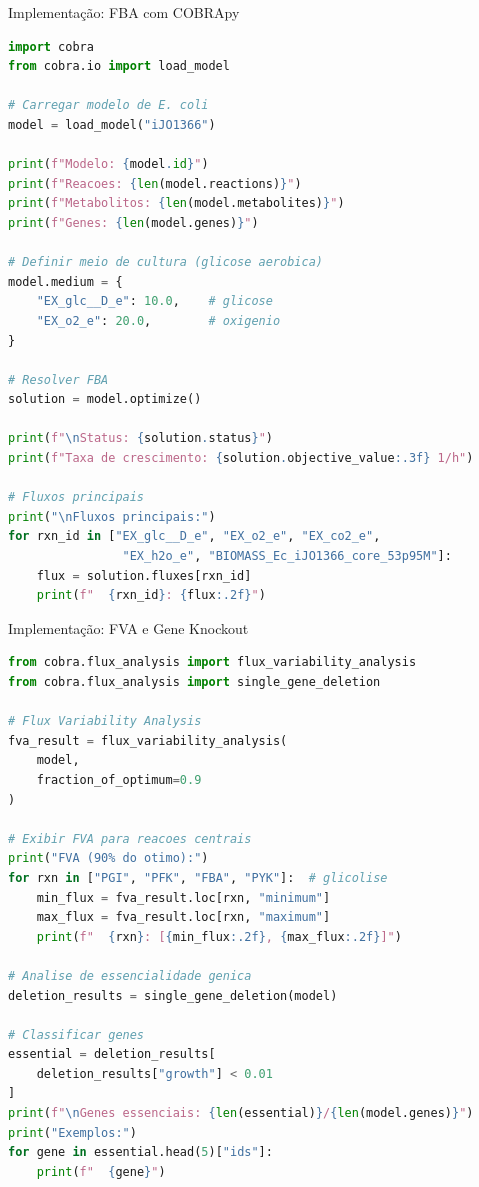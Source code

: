 \begin{frame}[fragile]{Implementação: FBA com COBRApy}
\begin{lstlisting}[language=Python, caption=FBA básico com COBRApy]
import cobra
from cobra.io import load_model

# Carregar modelo de E. coli
model = load_model("iJO1366")

print(f"Modelo: {model.id}")
print(f"Reacoes: {len(model.reactions)}")
print(f"Metabolitos: {len(model.metabolites)}")
print(f"Genes: {len(model.genes)}")

# Definir meio de cultura (glicose aerobica)
model.medium = {
    "EX_glc__D_e": 10.0,    # glicose
    "EX_o2_e": 20.0,        # oxigenio
}

# Resolver FBA
solution = model.optimize()

print(f"\nStatus: {solution.status}")
print(f"Taxa de crescimento: {solution.objective_value:.3f} 1/h")

# Fluxos principais
print("\nFluxos principais:")
for rxn_id in ["EX_glc__D_e", "EX_o2_e", "EX_co2_e",
                "EX_h2o_e", "BIOMASS_Ec_iJO1366_core_53p95M"]:
    flux = solution.fluxes[rxn_id]
    print(f"  {rxn_id}: {flux:.2f}")
\end{lstlisting}
\end{frame}

\begin{frame}[fragile]{Implementação: FVA e Gene Knockout}
\begin{lstlisting}[language=Python, caption=FVA e análise de essencialidade, basicstyle=\ttfamily\footnotesize]
from cobra.flux_analysis import flux_variability_analysis
from cobra.flux_analysis import single_gene_deletion

# Flux Variability Analysis
fva_result = flux_variability_analysis(
    model,
    fraction_of_optimum=0.9
)

# Exibir FVA para reacoes centrais
print("FVA (90% do otimo):")
for rxn in ["PGI", "PFK", "FBA", "PYK"]:  # glicolise
    min_flux = fva_result.loc[rxn, "minimum"]
    max_flux = fva_result.loc[rxn, "maximum"]
    print(f"  {rxn}: [{min_flux:.2f}, {max_flux:.2f}]")

# Analise de essencialidade genica
deletion_results = single_gene_deletion(model)

# Classificar genes
essential = deletion_results[
    deletion_results["growth"] < 0.01
]
print(f"\nGenes essenciais: {len(essential)}/{len(model.genes)}")
print("Exemplos:")
for gene in essential.head(5)["ids"]:
    print(f"  {gene}")
\end{lstlisting}
\end{frame}

